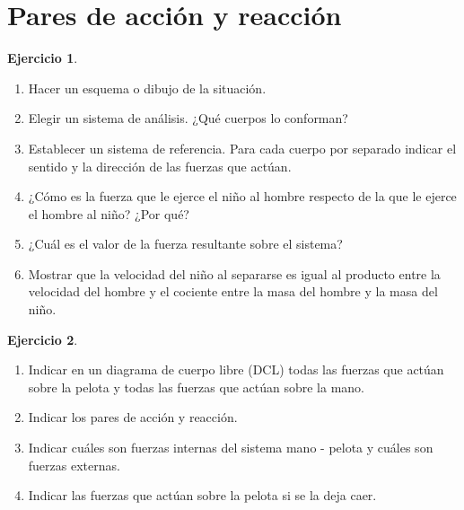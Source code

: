 \documentclass[a4paper,12pt,twoside]{book}
\newtheorem{ejercicio}{{Ejercicio}}[chapter]
\begin{document}
\section{Pares de acción y reacción}

\begin{mdframed}[style=ejercicio-conceptual]
    \begin{ejercicio}
    \end{ejercicio}
    \begin{enumerate}
        \item Hacer un esquema o dibujo de la situación. 
        \item Elegir un sistema de análisis. ¿Qué cuerpos lo conforman?
        \item Establecer un sistema de referencia. Para cada cuerpo por separado indicar el sentido y la dirección de las fuerzas que actúan.
        \item ¿Cómo es la fuerza que le ejerce el niño al hombre respecto de la que le ejerce el hombre al niño? ¿Por qué? 
        \item ¿Cuál es el valor de la fuerza resultante sobre el sistema? 
        \item Mostrar que la velocidad del niño al separarse es igual al producto entre la velocidad del hombre y el cociente entre la masa del hombre y la masa del niño. 
    \end{enumerate}
\end{mdframed}

\begin{mdframed}[style=ejercicio-facil]
    \begin{ejercicio}
    \end{ejercicio}
    \begin{enumerate}
        \item Indicar en un diagrama de cuerpo libre (DCL) todas las fuerzas que actúan sobre la pelota y todas las fuerzas que actúan sobre la mano.  
        \item Indicar los pares de acción y reacción.
        \item Indicar cuáles son fuerzas internas del sistema mano - pelota y cuáles son fuerzas externas.
        \item Indicar las fuerzas que actúan sobre la pelota si se la deja caer.
    \end{enumerate}
\end{mdframed}
\end{document}
